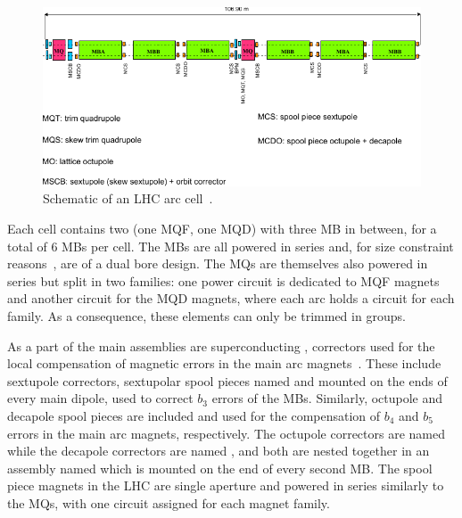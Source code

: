 \begin{figure}[!hbt]
  \centering
  \includegraphics*[width=0.99\linewidth]{Figures/Optics_Measurements_Corrections_at_LHC/lhc_schematic_arc_cell.pdf}
  \caption{Schematic of an LHC arc cell~\cite{BOOK:Bruning:LHC_Design_Report_Main_Ring}.}
  \label{figure:lhc_schematic_arc_cell}
\end{figure}

Each cell contains two  (one MQF, one MQD) with three MB in between, for a total of 6 MBs per cell.
The MBs are all powered in series and, for size constraint reasons~\cite{BOOK:Bruning:LHC_Design_Report_Main_Ring}, are of a dual bore design.
The MQs are themselves also powered in series but split in two families: one power circuit is dedicated to MQF magnets and another circuit for the MQD magnets, where each arc holds a circuit for each family.
As a consequence, these elements can only be trimmed in groups.

As a part of the main assemblies are superconducting , correctors used for the local compensation of magnetic errors in the main arc magnets~\cite{BOOK:Bruning:LHC_Design_Report_Main_Ring}.
These include sextupole correctors, sextupolar spool pieces named  and mounted on the ends of every main dipole, used to correct \(b_3\) errors of the MBs.
Similarly, octupole and decapole spool pieces are included and used for the compensation of \(b_4\) and \(b_5\) errors in the main arc magnets, respectively.
The octupole correctors are named  while the decapole correctors are named , and both are nested together in an assembly named  which is mounted on the end of every second MB.
The spool piece magnets in the LHC are single aperture and powered in series similarly to the MQs, with one circuit assigned for each magnet family.

